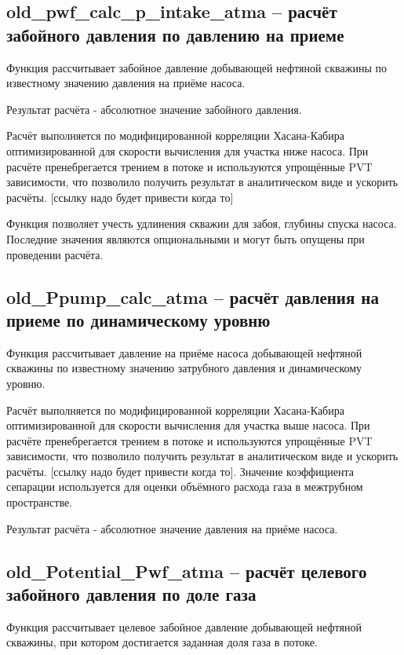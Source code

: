 


\subsection{old\_pwf\_calc\_p\_intake\_atma – расчёт забойного давления по давлению на приеме}
Функция рассчитывает забойное давление добывающей нефтяной скважины по известному значению давления на приёме насоса. 

Результат расчёта - абсолютное значение забойного давления. 

Расчёт выполняется по модифицированной корреляции Хасана-Кабира оптимизированной для скорости вычисления для участка ниже насоса. При расчёте пренебрегается трением в потоке и используются упрощённые PVT зависимости, что позволило получить результат в аналитическом виде и ускорить расчёты. [ссылку надо будет привести когда то] 

Функция позволяет учесть удлинения скважин для забоя, глубины спуска насоса. Последние значения являются опциональными и могут быть опущены при проведении расчёта. 


\subsection{old\_Ppump\_calc\_atma – расчёт давления на приеме по динамическому уровню}
Функция рассчитывает давление на приёме насоса добывающей нефтяной скважины по известному значению затрубного давления и динамическому уровню. 

Расчёт выполняется по модифицированной корреляции Хасана-Кабира оптимизированной для скорости вычисления для участка выше насоса. При расчёте пренебрегается трением в потоке и используются упрощённые PVT зависимости, что позволило получить результат в аналитическом виде и ускорить расчёты. [ссылку надо будет привести когда то]. Значение коэффициента сепарации используется для оценки объёмного расхода газа в межтрубном пространстве. 

Результат расчёта - абсолютное значение давления на приёме насоса. 



\subsection{old\_Potential\_Pwf\_atma – расчёт целевого забойного давления по доле газа}
Функция рассчитывает целевое забойное давление добывающей нефтяной скважины, при котором достигается заданная доля газа в потоке.

